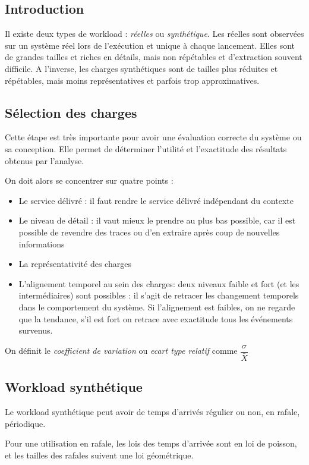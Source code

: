 \documentclass{article}
\begin{document}
\subsection{Introduction}
Il existe deux types de workload : \emph{réelles} ou \emph{synthétique}. Les réelles sont observées sur un système réel lors de l'exécution et unique à chaque lancement. Elles sont de grandes tailles et riches en détails, mais non répétables et d'extraction souvent difficile.
A l'inverse, les charges synthétiques sont de tailles plus réduites et répétables, mais moins représentatives et parfois trop approximatives.

\subsection{Sélection des charges}
Cette étape est très importante pour avoir une évaluation correcte du système ou sa conception. Elle permet de déterminer l'utilité et l'exactitude des résultats obtenus par l'analyse.

On doit alors se concentrer sur quatre points :
\begin{itemize}
\item Le service délivré : il faut rendre le service délivré indépendant du contexte
\item Le niveau de détail : il vaut mieux le prendre au plus bas possible, car il est possible de revendre des traces ou d'en extraire après coup de nouvelles informations
\item La représentativité des charges
\item L'alignement temporel au sein des charges: deux niveaux faible et fort (et les intermédiaires) sont possibles : il s'agit de retracer les changement temporels dans le comportement du système. Si l'alignement est faibles, on ne regarde que la tendance, s'il est fort on retrace avec exactitude tous les événements survenus.
\end{itemize}

On définit le \emph{coefficient de variation} ou \emph{ecart type relatif} comme $\dfrac{\sigma}{\bar{X}}$

\subsection{Workload synthétique}
Le workload synthétique peut avoir de temps d'arrivés régulier ou non, en rafale, périodique.

Pour une utilisation en rafale, les lois des temps d'arrivée sont en loi de poisson, et les tailles des rafales suivent une loi géométrique.
\end{document}
